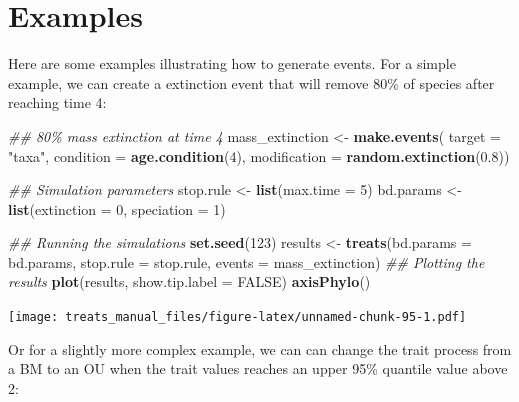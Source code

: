 \documentclass[
]{book}
\newenvironment{Shaded}{\begin{snugshade}}{\end{snugshade}}
\newcommand{\CommentTok}[1]{\textcolor[rgb]{0.56,0.35,0.01}{\textit{#1}}}
\newcommand{\DataTypeTok}[1]{\textcolor[rgb]{0.13,0.29,0.53}{#1}}
\newcommand{\DecValTok}[1]{\textcolor[rgb]{0.00,0.00,0.81}{#1}}
\newcommand{\FloatTok}[1]{\textcolor[rgb]{0.00,0.00,0.81}{#1}}
\newcommand{\KeywordTok}[1]{\textcolor[rgb]{0.13,0.29,0.53}{\textbf{#1}}}
\newcommand{\NormalTok}[1]{#1}
\newcommand{\OtherTok}[1]{\textcolor[rgb]{0.56,0.35,0.01}{#1}}
\newcommand{\StringTok}[1]{\textcolor[rgb]{0.31,0.60,0.02}{#1}}
\begin{document}
\hypertarget{examples}{%
\section{Examples}\label{examples}}

Here are some examples illustrating how to generate events.
For a simple example, we can create a extinction event that will remove 80\% of species after reaching time 4:

\begin{Shaded}
\begin{Highlighting}[]
\CommentTok{\#\# 80\% mass extinction at time 4}
\NormalTok{mass\_extinction \textless{}{-}}\StringTok{ }\KeywordTok{make.events}\NormalTok{(}
                      \DataTypeTok{target       =} \StringTok{"taxa"}\NormalTok{,}
                      \DataTypeTok{condition    =} \KeywordTok{age.condition}\NormalTok{(}\DecValTok{4}\NormalTok{),}
                      \DataTypeTok{modification =} \KeywordTok{random.extinction}\NormalTok{(}\FloatTok{0.8}\NormalTok{))}

\CommentTok{\#\# Simulation parameters}
\NormalTok{stop.rule \textless{}{-}}\StringTok{ }\KeywordTok{list}\NormalTok{(}\DataTypeTok{max.time =} \DecValTok{5}\NormalTok{)}
\NormalTok{bd.params \textless{}{-}}\StringTok{ }\KeywordTok{list}\NormalTok{(}\DataTypeTok{extinction =} \DecValTok{0}\NormalTok{, }\DataTypeTok{speciation =} \DecValTok{1}\NormalTok{)}

\CommentTok{\#\# Running the simulations}
\KeywordTok{set.seed}\NormalTok{(}\DecValTok{123}\NormalTok{)}
\NormalTok{results \textless{}{-}}\StringTok{ }\KeywordTok{treats}\NormalTok{(}\DataTypeTok{bd.params =}\NormalTok{ bd.params,}
                  \DataTypeTok{stop.rule =}\NormalTok{ stop.rule,}
                  \DataTypeTok{events    =}\NormalTok{ mass\_extinction)}
\CommentTok{\#\# Plotting the results}
\KeywordTok{plot}\NormalTok{(results, }\DataTypeTok{show.tip.label =} \OtherTok{FALSE}\NormalTok{)}
\KeywordTok{axisPhylo}\NormalTok{()}
\end{Highlighting}
\end{Shaded}

\texttt{[image: treats\_manual\_files/figure-latex/unnamed-chunk-95-1.pdf]}

Or for a slightly more complex example, we can can change the trait process from a BM to an OU when the trait values reaches an upper 95\% quantile value above 2:
\end{document}
